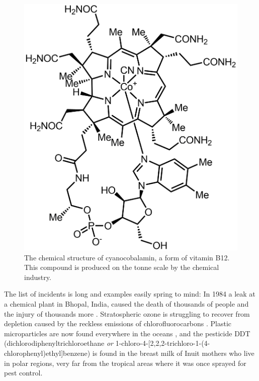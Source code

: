 \begin{figure}
\centering
\includegraphics[width=\textwidth]{Figures/Cyanocobalamin-b12.png}
\decoRule

\caption[Cyanocobalamin]{The chemical structure of cyanocobalamin, a form of
vitamin B12. This compound is produced on the tonne scale by the chemical
industry.}

\label{fig:vitb12}

\end{figure}

The list of incidents is long and examples easily spring to mind: In 1984 a leak
at a chemical plant in Bhopal, India, caused the death of thousands of people
and the injury of thousands more \autocite{Varma2005}.
Stratospheric ozone is struggling to recover from depletion caused by the
reckless emissions of chlorofluorocarbons \autocite{Ball2018}. Plastic
microparticles are now found everywhere in the oceans \autocite{Woodall2014},
and the pesticide DDT (dichlorodiphenyltrichloroethane \textit{or}
1-chloro-4-[2,2,2-trichloro-1-(4-chlorophenyl)ethyl]benzene) is found in the
breast milk of Inuit mothers \autocite{Gibson2016} who live in polar regions,
very far from the tropical areas where it was once sprayed for pest control.

